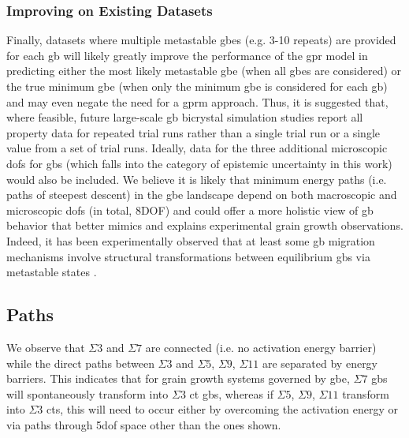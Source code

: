 \documentclass[final,twocolumn,12pt]{elsarticle}
\begin{document}
	\subsubsection{Improving on Existing Datasets} \label{sec:discuss:lit:improve}
	Finally, datasets where multiple metastable \glspl{gbe} (e.g. 3-10 repeats) are provided for each \gls{gb} will likely greatly improve the performance of the \gls{gpr} model in predicting either the most likely metastable \gls{gbe} (when all \glspl{gbe} are considered) or the true minimum \gls{gbe} (when only the minimum \gls{gbe} is considered for each \gls{gb}) and may even negate the need for a \gls{gprm} approach. Thus, it is suggested that, where feasible, future large-scale \gls{gb} bicrystal simulation studies report all property data for repeated trial runs rather than a single trial run or a single value from a set of trial runs. Ideally, data for the three additional microscopic \glspl{dof} for \glspl{gb} (which falls into the category of epistemic uncertainty in this work) would also be included. We believe it is likely that minimum energy paths (i.e. paths of steepest descent) in the \gls{gbe} landscape depend on both macroscopic and microscopic \glspl{dof} (in total, 8DOF) and could offer a more holistic view of \gls{gb} behavior that better mimics and explains experimental grain growth observations. Indeed, it has been experimentally observed that at least some \gls{gb} migration mechanisms involve structural transformations between equilibrium \glspl{gb} via metastable states \cite{weiDirectImagingAtomistic2021}.
	 
    \subsection{ Paths} \label{sec:discuss:path}
     We observe that $\Sigma3$ and $\Sigma7$ are connected (i.e. no activation energy barrier) while the direct paths between $\Sigma3$ and $\Sigma5$, $\Sigma9$, $\Sigma11$ are separated by energy barriers. This indicates that for grain growth systems governed by \gls{gbe}, $\Sigma7$ \glspl{gb} will spontaneously transform into $\Sigma3$ \gls{ct} \glspl{gb}, whereas if $\Sigma5$, $\Sigma9$, $\Sigma11$ transform into $\Sigma3$ \glspl{ct}, this will need to occur either by overcoming the activation energy or via paths through \gls{5dof} space other than the ones shown.
\end{document}
